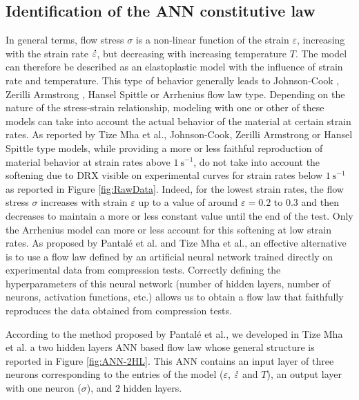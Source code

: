 \documentclass[metals,article,submit,pdftex,moreauthors]{Definitions/mdpi}
\makeatletter
\DeclareRobustCommand{\mdot}[1]{\accentset{\mbox{\bfseries .}}{#1}}
\DeclareRobustCommand{\eal}{et al.\@\xspace}
\DeclareRobustCommand{\ps}{\text{s}^{-1}}
\makeatother
\begin{document}
\subsection{Identification of the ANN constitutive law\label{subsec:ANNConstitutiveLaw}}
In general terms, flow stress $\sigma$ is a non-linear function of the strain $\varepsilon$, increasing with the strain rate $\mdot\varepsilon$, but decreasing with increasing temperature $T$.
The model can therefore be described as an elastoplastic model with the influence of strain rate and temperature.
This type of behavior generally leads to Johnson-Cook \cite{Johnson-1983}, Zerilli Armstrong \cite{Zerilli-1987}, Hansel Spittle \cite{Hensel-1978} or Arrhenius \cite{Sellars-1966} flow law type.
Depending on the nature of the stress-strain relationship, modeling with one or other of these models can take into account the actual behavior of the material at certain strain rates.
As reported by Tize Mha \eal \cite{TizeMha-2023}, Johnson-Cook, Zerilli Armstrong or Hansel Spittle type models, while providing a more or less faithful reproduction of material behavior at strain rates above $1~\ps$, do not take into account the softening due to DRX visible on experimental curves for strain rates below $1~\ps$ as reported in Figure  \ref{fig:RawData}.
Indeed, for the lowest strain rates, the flow stress $\sigma$ increases with strain $\varepsilon$ up to a value of around $\varepsilon=0.2$ to $0.3$ and then decreases to maintain a more or less constant value until the end of the test.
Only the Arrhenius model can more or less account for this softening at low strain rates.
As proposed by Pantalé \eal \cite{Pantale-2021, Pantale-2023} and Tize Mha \eal \cite{TizeMha-2023}, an effective alternative is to use a flow law defined by an artificial neural network trained directly on experimental data from compression tests.
Correctly defining the hyperparameters of this neural network (number of hidden layers, number of neurons, activation functions, etc.) allows us to obtain a flow law that faithfully reproduces the data obtained from compression tests.

According to the method proposed by Pantalé \eal \cite{Pantale-2021, Pantale-2023}, we developed in Tize Mha \eal \cite{TizeMha-2023} a two hidden layers ANN based flow law whose general structure is reported in Figure \ref{fig:ANN-2HL}.
This ANN contains an input layer of three neurons corresponding to the entries of the model ($\varepsilon$, $\mdot\varepsilon$ and $T$), an output layer with one neuron ($\sigma$), and $2$ hidden layers.
\end{document}
